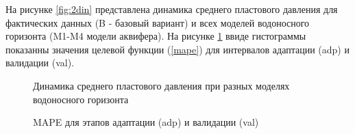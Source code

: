 \documentclass{article}
\begin{document}
На рисунке \ref{fig:2din} представлена динамика среднего пластового давления для фактических данных (B - базовый вариант) и всех моделей водоносного горизонта (M1-M4 модели аквифера). На рисунке \ref{fig:hist} ввиде гистограммы показанны значения целевой функции (\ref{mape}) для интервалов адаптации (adp) и валидации (val).
\begin{figure} 
    \begin{minipage}[h]{0.48\linewidth}
      \caption{Динамика среднего пластового давления при разных моделях водоносного горизонта}
      \label{fig:din}
    \end{minipage} \hfill
    \begin{minipage}[h]{0.48\linewidth}
      \caption{MAPE для этапов адаптации (adp) и валидации (val)}
      \label{fig:hist}
    \end{minipage} 
\end{figure}
\end{document}
